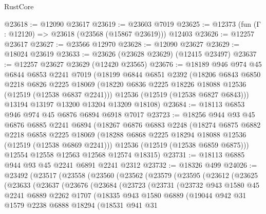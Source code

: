 \begin{lexlean}{RustCore}
\begin{coremodule}
@23618 := @12090 @23617
@23619 := @23603 @7019
@23625 := @12373 (fun (Γ : @12120) => @23618 (@23568 (@15867 @23619))) @12403
@23626 := @12257 @23617
@23627 := @23566 @12970
@23628 := @12090 @23627
@23629 := @18024 @23619
@23633 := @23626 (@23628 @23629) (@12415 @23497)
@23637 := @12257 @23627 @23629 (@12420 @23565)
@23676 := @18189
    @946
    @974
    @45
    @6844
    @6853
    @2241
    @7019
    (@18199
      @6844
      @6851
      @2392
      (@18206
        @6843
        @6850
        @2218
        @6826
        @2225
        @18069
        (@18220 @6836 @2225 @18226 @18088 @12536 (@12519 (@12538 @6837 @2241)))
        @12536
        (@12519 (@12538 @6827 @6843)))
      @13194
      @13197
      @13200
      @13204
      @13209
      @18108)
@23684 := @18113 @6853 @946 @974 @45 @6876 @6894 @6918 @7017
@23723 := @18256
    @944
    @93
    @45
    @6876
    @6885
    @2241
    @6894
    (@18267
      @6876
      @6883
      @2248
      (@18274
        @6875
        @6882
        @2218
        @6858
        @2225
        @18069
        (@18288 @6868 @2225 @18294 @18088 @12536 (@12519 (@12538 @6869 @2241)))
        @12536
        (@12519 (@12538 @6859 @6875)))
      @12554
      @12558
      @12563
      @12568
      @12574
      @18315)
@23731 := @18113 @6885 @944 @93 @45 @2241 @6891 @2241 @2312
@23732 := @18326 @499
@24026 := @23492
    (@23517
      (@23558
        (@23560
          (@23562
            (@23579
              (@23595
                (@23612
                  (@23625
                    (@23633
                      (@23637
                        (@23676
                          (@23684
                            (@23723
                              (@23731
                                (@23732
                                  @943
                                  @1580
                                  @45
                                  @2241
                                  @6889
                                  @2262
                                  @1707
                                  (@18335
                                    @943
                                    @1580
                                    @6889
                                    (@19044
                                      @942
                                      @31
                                      @1579
                                      @2238
                                      @6888
                                      @18294
                                      (@18531
                                        @941
                                        @31

\end{coremodule}
\end{lexlean}
